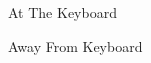 
\begin{cvskills}

	\cvskill
	{At The Keyboard}
	{}

	\cvskill
	{Away From Keyboard}
	{}

\end{cvskills}

